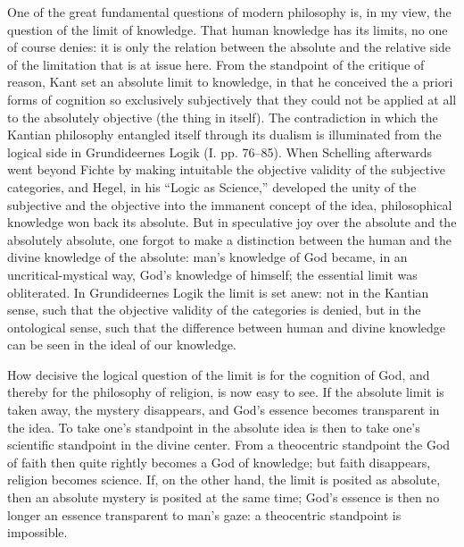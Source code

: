 \documentclass[12pt]{book}
\newcommand{\opage}[1]{\marginnote{\footnotesize\textit{[#1]}}}
\begin{document}
One of the great fundamental questions of modern philosophy is, in my view, the question of the limit of knowledge. That human knowledge has its limits, no one of course denies: it is only the relation between the absolute and the relative side of the limitation that is at issue here. From
\opage{134}\setcounter{footnote}{0}%
the standpoint of the critique of reason, Kant set an absolute limit to knowledge, in that he conceived the a priori forms of cognition so exclusively subjectively that they could not be applied at all to the absolutely objective (the thing in itself). The contradiction in which the Kantian philosophy entangled itself through its dualism is illuminated from the logical side in Grundideernes Logik (I. pp. 76--85). When Schelling afterwards went beyond Fichte by making intuitable the objective validity of the subjective categories, and Hegel, in his ``Logic as Science,'' developed the unity of the subjective and the objective into the immanent concept of the idea, philosophical knowledge won back its absolute. But in speculative joy over the absolute and the absolutely absolute, one forgot to make a distinction between the human and the divine knowledge of the absolute: man's knowledge of God became, in an uncritical-mystical way, God's knowledge of himself; the essential limit was obliterated. In Grundideernes Logik the limit is set anew: not in the Kantian sense, such that the objective validity of the categories is denied, but in the ontological sense, such that the difference between human and divine knowledge can be seen in the ideal of our knowledge.

How decisive the logical question of the limit is for the cognition of God, and thereby for the philosophy of religion, is now easy to see. If the absolute limit is taken away, the mystery disappears, and God's essence becomes transparent in the idea. To take one's standpoint in the absolute idea is then to take one's scientific standpoint in the divine center. From a theocentric standpoint the God of faith then quite rightly becomes a God of knowledge; but faith disappears, religion becomes science. If, on the other hand, the limit is posited as absolute, then an absolute mystery is posited at the same time; God's essence is then no longer an essence transparent to man's gaze: a theocentric standpoint is impossible.
\end{document}
